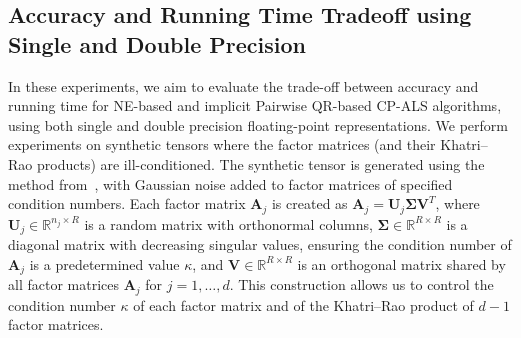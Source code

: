 \documentclass{article}
\newcommand{\mat}[1]{\mathbf{#1}}
\begin{document}
{\color{blue}
\subsection{Accuracy and Running Time Tradeoff using Single and Double Precision }
In these experiments, we aim to evaluate the trade-off between accuracy and running time for NE-based and implicit Pairwise QR-based CP-ALS algorithms, using both single and double precision floating-point representations. 
We perform experiments on synthetic tensors where the factor matrices (and their Khatri--Rao products) are ill-conditioned. 
The synthetic tensor is generated using the method from~\cite{MVLB23}, with Gaussian noise added to factor matrices of specified condition numbers. 
Each factor matrix $\mat{A}_j$ is created as $\mat{A}_j = \mat{U}_j  \boldsymbol{\Sigma} \mat{V}^T$, where $\mat{U}_j \in \mathbb{R}^{n_j \times R}$ is a random matrix with orthonormal columns, $ \boldsymbol{\Sigma} \in \mathbb{R}^{R \times R}$ is a diagonal matrix with decreasing singular values, ensuring the condition number of  $\mat{A}_j$ is a predetermined value $\kappa$, and $\mat{V} \in \mathbb{R}^{R \times R}$ is an orthogonal matrix shared by all factor matrices $\mat{A}_j $ for $j = 1, \dots, d $. 
This construction allows us to control the condition number \( \kappa \) of each factor matrix and of the Khatri--Rao product of \( d-1 \) factor matrices. 



}
\end{document}
